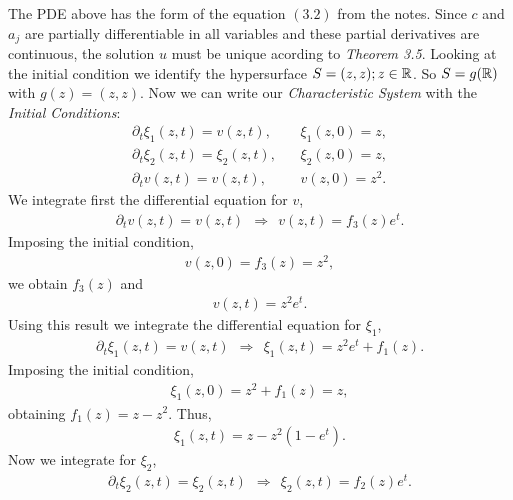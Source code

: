 \begin{questions}


\begin{solution}
The PDE above has the form of the equation $(3.2)$ from the notes. Since $c$ and $a_j$ are partially differentiable in all variables and these partial derivatives are continuous, the solution $u$ must be unique acording to \textsl{Theorem 3.5}. Looking at the initial condition we identify the hypersurface $S={(z,z);z\in\mathbb{R}}$. So $S=g(\mathbb{R})$ with $g(z)=(z,z)$. Now we can write our \textit{Characteristic System} with the \textit{Initial Conditions}:
\begin{align*}
\partial_t\xi_1(z,t)=v(z,t),~~&~~\xi_1(z,0)=z,\\
\partial_t\xi_2(z,t)=\xi_2(z,t),~~&~~\xi_2(z,0)=z,\\
\partial_tv(z,t)=v(z,t),~~&~~v(z,0)=z^2.
\end{align*}
We integrate first the differential equation for $v$,
\begin{align*}
\partial_t v(z,t)=v(z,t)~~\Rightarrow~~ v(z,t)=f_3(z)e^t.
\end{align*}
Imposing the initial condition,
\begin{align*}
v(z,0)=f_3(z)=z^2,
\end{align*}
we obtain $f_3(z)$ and
\begin{align*}
v(z,t)=z^2e^t.
\end{align*}
Using this result we integrate the differential equation for $\xi_1$,
\begin{align*}
\partial_t \xi_1(z,t)=v(z,t)~~\Rightarrow~~ \xi_1(z,t)=z^2e^t+f_1(z).
\end{align*}
Imposing the initial condition,
\begin{align*}
\xi_1(z,0)=z^2+f_1(z)=z,
\end{align*}
obtaining $f_1(z)=z-z^2$. Thus, 
\begin{align*}
\xi_1(z,t)=z-z^2(1-e^t).
\end{align*}
Now we integrate for $\xi_2$,
\begin{align*}
\partial_t \xi_2(z,t)=\xi_2(z,t)~~\Rightarrow~~ \xi_2(z,t)=f_2(z)e^t.
\end{align*}

\end{solution}
\end{questions}
